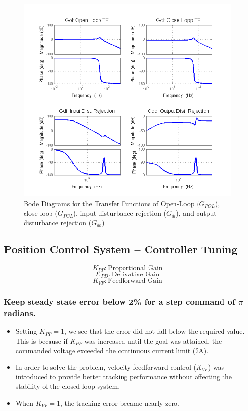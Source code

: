 \documentclass{article}
\theoremstyle{plain}
\theoremstyle{definition}
\theoremstyle{remark}
\begin{document}
\begin{figure}[htb]
\begin{center}
\includegraphics[width = 16 cm]{q3_16}
\caption{Bode Diagrams for the Transfer Functions of Open-Loop ($G_{POL}$), close-loop ($G_{PCL}$), input disturbance rejection ($G_{di}$), and output disturbance rejection ($G_{do}$) }
\label{q3_16}
\end{center}
\end{figure}

\clearpage

\subsection*{Position Control System – Controller Tuning}

$$K_{PP}: \text{Proportional Gain}$$
$$K_{PD}: \text{Derivative Gain}$$
$$K_{VF}: \text{Feedforward Gain}$$

\subsubsection*{Keep steady state error below 2\% for a step command of $\pi$ radians.}
\begin{itemize}
\item Setting $K_{PP}=1$, we see that the error did not fall below the required value. This is because if $K_{PP}$ was increased until the goal was attained, the commanded voltage exceeded the continuous current limit (2A).

\item In order to solve the problem, velocity feedforward control ($K_{VF}$) was introduced to provide better tracking performance without affecting the stability of the closed-loop system.

\item When $K_{VF} = 1$, the tracking error became nearly zero. 
\end{itemize}
\end{document}
